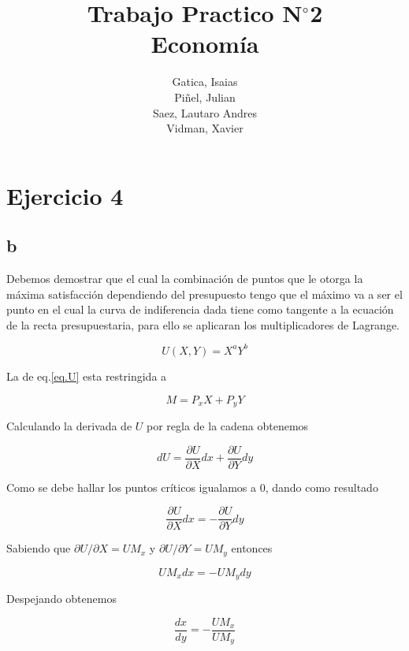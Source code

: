\documentclass[letterpaper]{article}
\title{ Trabajo Practico N$^\circ$2 \\ Economía }
\author{ Gatica, Isaias \\ Piñel, Julian \\ Saez, Lautaro Andres \\ Vidman, Xavier  }
\date{}
\begin{document}
\maketitle

\section{Ejercicio 4}

\subsection*{b}

Debemos demostrar que el cual la combinación de puntos que le otorga la máxima satisfacción dependiendo del presupuesto
tengo que el máximo va a ser el punto en el cual la curva de indiferencia dada tiene como tangente 
a la ecuación de la recta presupuestaria, para ello se aplicaran los multiplicadores de Lagrange.

\begin{equation}
\label{eq.U}
U(X,Y)=X^aY^b 
\end{equation}

La  de eq.\ref{eq.U} esta restringida a 

\begin{equation}
\label{eq.restriccion}
M = P_xX+P_yY
\end{equation}

Calculando la derivada de $U$ por regla de la cadena obtenemos

\begin{equation}
\label{eq.dU}
dU= \frac{\partial U}{\partial X}dx + \frac{\partial U}{\partial Y}dy
\end{equation}

Como se debe hallar los puntos críticos igualamos a 0, dando 
como resultado 

\begin{equation}
\frac{\partial U}{\partial X}dx = -\frac{\partial U}{\partial Y}dy
\end{equation}
    
Sabiendo que $\partial U/\partial X=UM_x$ y $\partial U/\partial Y=UM_y$ entonces

\begin{equation}
UM_xdx = -UM_ydy
\end{equation}

Despejando obtenemos 

\begin{equation}
\label{eq.dy1}
\frac{dx}{dy}=-\frac{UM_x}{UM_y}
\end{equation}
\end{document}
